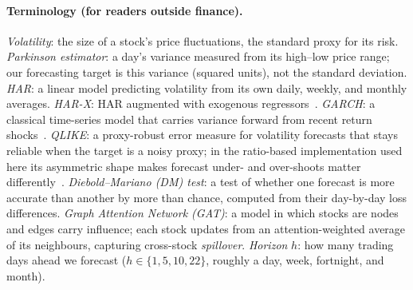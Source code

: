 \documentclass[runningheads]{llncs}
\begin{document}
\paragraph{Terminology (for readers outside finance).}
\emph{Volatility}: the size of a stock's price fluctuations, the standard proxy for its risk.
\emph{Parkinson estimator}: a day's variance measured from its high--low price range; our
forecasting target is this variance (squared units), not the standard deviation.
\emph{HAR}: a linear model predicting volatility from its own daily, weekly, and monthly averages.
\emph{HAR-X}: HAR augmented with exogenous regressors~\cite{corsi2009,clements2024}.
\emph{GARCH}: a classical time-series model that carries variance forward from recent return shocks~\cite{bollerslev1986}.
\emph{QLIKE}: a proxy-robust error measure for volatility forecasts that stays reliable when the
target is a noisy proxy; in the ratio-based implementation used here its asymmetric shape makes
forecast under- and over-shoots matter differently~\cite{patton2011}.
\emph{Diebold--Mariano (DM) test}: a test of whether one forecast is more accurate than another by
more than chance, computed from their day-by-day loss differences.
\emph{Graph Attention Network (GAT)}: a model in which stocks are nodes and edges carry influence;
each stock updates from an attention-weighted average of its neighbours, capturing cross-stock
\emph{spillover}.
\emph{Horizon} $h$: how many trading days ahead we forecast ($h\in\{1,5,10,22\}$, roughly a day,
week, fortnight, and month).
\end{document}
